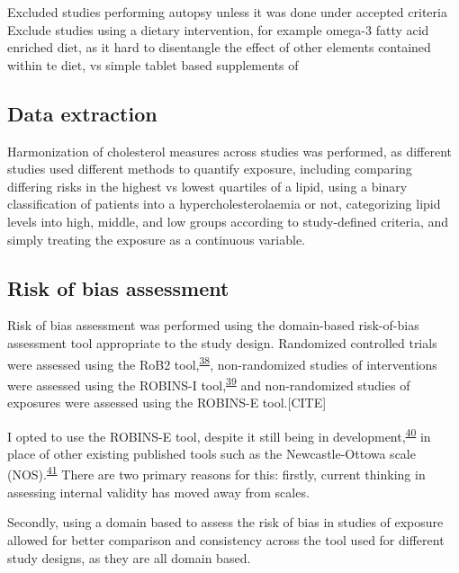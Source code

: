 \documentclass[a4paper, twoside]{templates/ociamthesis}
\begin{document}
Excluded studies performing autopsy unless it was done under accepted criteria Exclude studies using a dietary intervention, for example omega-3 fatty acid enriched diet, as it hard to disentangle the effect of other elements contained within te diet, vs simple tablet based supplements of

\hypertarget{data-extraction}{%
\subsection{Data extraction}\label{data-extraction}}

Harmonization of cholesterol measures across studies was performed, as different studies used different methods to quantify exposure, including comparing differing risks in the highest vs lowest quartiles of a lipid, using a binary classification of patients into a hypercholesterolaemia or not, categorizing lipid levels into high, middle, and low groups according to study-defined criteria, and simply treating the exposure as a continuous variable.

\hypertarget{risk-of-bias}{%
\subsection{Risk of bias assessment}\label{risk-of-bias}}

Risk of bias assessment was performed using the domain-based risk-of-bias assessment tool appropriate to the study design. Randomized controlled trials were assessed using the RoB2 tool,\textsuperscript{\protect\hyperlink{ref-sterne2019}{38}}, non-randomized studies of interventions were assessed using the ROBINS-I tool,\textsuperscript{\protect\hyperlink{ref-sterne2016}{39}} and non-randomized studies of exposures were assessed using the ROBINS-E tool.{[}CITE{]}

I opted to use the ROBINS-E tool, despite it still being in development,\textsuperscript{\protect\hyperlink{ref-morganr2020}{40}} in place of other existing published tools such as the Newcastle-Ottowa scale (NOS).\textsuperscript{\protect\hyperlink{ref-wells2000newcastle}{41}} There are two primary reasons for this: firstly, current thinking in assessing internal validity has moved away from scales.

Secondly, using a domain based to assess the risk of bias in studies of exposure allowed for better comparison and consistency across the tool used for different study designs, as they are all domain based.
\end{document}
